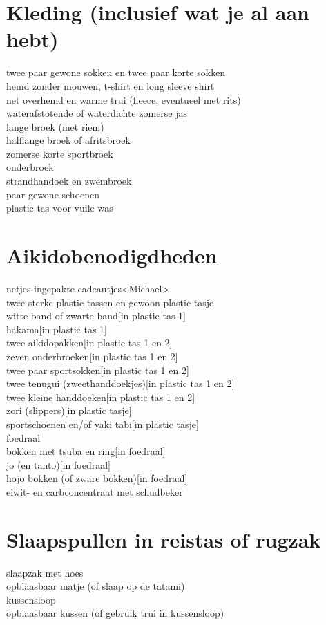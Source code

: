 \documentclass[9pt,twocolumn]{memoir}
\begin{document}
\section*{Kleding (inclusief wat je al aan hebt)}
twee paar gewone sokken en twee paar korte sokken\\
hemd zonder mouwen, t-shirt en long sleeve shirt\\
net overhemd en warme trui (fleece, eventueel met rits)\\
waterafstotende of waterdichte zomerse jas\\
lange broek (met riem)\\
halflange broek of afritsbroek\\
zomerse korte sportbroek\\
onderbroek\\
strandhandoek en zwembroek\\
paar gewone schoenen\\
plastic tas voor vuile was

\section*{Aikidobenodigdheden}
netjes ingepakte cadeautjes\hfill<Michael>\\
twee sterke plastic tassen en gewoon plastic tasje\\
witte band of zwarte band\hfill[in plastic tas 1]\\
hakama\hfill[in plastic tas 1]\\
twee aikidopakken\hfill[in plastic tas 1 en 2]\\
zeven onderbroeken\hfill[in plastic tas 1 en 2]\\
twee paar sportsokken\hfill[in plastic tas 1 en 2]\\
twee tenugui (zweethanddoekjes)\hfill[in plastic tas 1 en 2]\\
twee kleine handdoeken\hfill[in plastic tas 1 en 2]\\
zori (slippers)\hfill[in plastic tasje]\\
sportschoenen en/of yaki tabi\hfill[in plastic tasje]\\
foedraal\\
bokken met tsuba en ring\hfill[in foedraal]\\
jo (en tanto)\hfill[in foedraal]\\
hojo bokken (of zware bokken)\hfill[in foedraal]\\
eiwit- en carbconcentraat met schudbeker

\section*{Slaapspullen in reistas of rugzak}
slaapzak met hoes\\
opblaasbaar matje (of slaap op de tatami)\\
kussensloop\\
opblaasbaar kussen (of gebruik trui in kussensloop)\\
\end{document}
